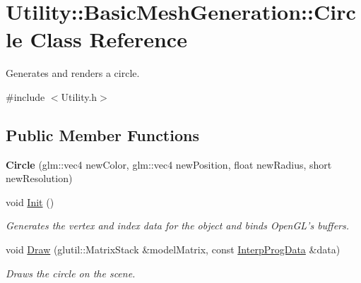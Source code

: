 \hypertarget{class_utility_1_1_basic_mesh_generation_1_1_circle}{\section{Utility\-:\-:Basic\-Mesh\-Generation\-:\-:Circle Class Reference}
\label{class_utility_1_1_basic_mesh_generation_1_1_circle}
}


Generates and renders a circle.  




{\ttfamily \#include $<$Utility.\-h$>$}

\subsection*{Public Member Functions}
\begin{DoxyCompactItemize}
\item 
\hypertarget{class_utility_1_1_basic_mesh_generation_1_1_circle_a495cd76f18a985924d661e0b11da9603}{{\bfseries Circle} (glm\-::vec4 new\-Color, glm\-::vec4 new\-Position, float new\-Radius, short new\-Resolution)}\label{class_utility_1_1_basic_mesh_generation_1_1_circle_a495cd76f18a985924d661e0b11da9603}

\item 
void \hyperlink{class_utility_1_1_basic_mesh_generation_1_1_circle_a9cec759d08091116ff27381b4be7f423}{Init} ()
\begin{DoxyCompactList}\small\item\em Generates the vertex and index data for the object and binds Open\-G\-L's buffers. \end{DoxyCompactList}\item 
\hypertarget{class_utility_1_1_basic_mesh_generation_1_1_circle_a468f553bc08e1953cdf7f4943ed7b82e}{void \hyperlink{class_utility_1_1_basic_mesh_generation_1_1_circle_a468f553bc08e1953cdf7f4943ed7b82e}{Draw} (glutil\-::\-Matrix\-Stack \&model\-Matrix, const \hyperlink{struct_interp_prog_data}{Interp\-Prog\-Data} \&data)}\label{class_utility_1_1_basic_mesh_generation_1_1_circle_a468f553bc08e1953cdf7f4943ed7b82e}

\begin{DoxyCompactList}\small\item\em Draws the circle on the scene. \end{DoxyCompactList}\end{DoxyCompactItemize}
